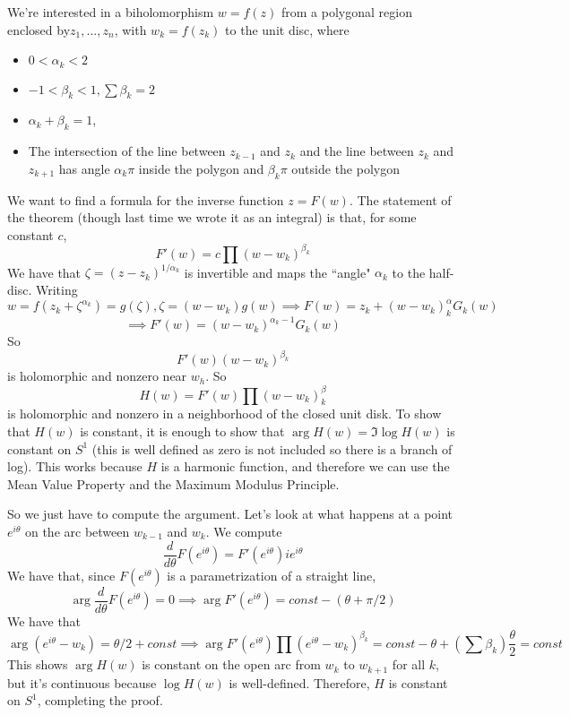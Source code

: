 \documentclass{article}
\begin{document}
We're interested in a biholomorphism \(w = f(z)\) from a polygonal region enclosed by\(z_1,...,z_n\), with \(w_k = f(z_k)\) to the unit disc, where
\begin{itemize}

  \item \(0 < \alpha_k < 2\)

  \item \(-1 < \beta_k < 1, \sum\beta_k = 2\)

  \item \(\alpha_k + \beta_k = 1\),

  \item The intersection of the line between \(z_{k - 1}\) and \(z_k\) and the line between \(z_k\) and \(z_{k + 1}\) has angle \(\alpha_k\pi\) inside the polygon and \(\beta_k\pi\) outside the polygon

\end{itemize}
We want to find a formula for the inverse function \(z = F(w)\). The statement of the theorem (though last time we wrote it as an integral) is that, for some constant \(c\),
\[F'(w) = c\prod(w - w_k)^{\beta_k}\]
We have that \(\zeta = (z - z_k)^{1/\alpha_k}\) is invertible and maps the ``angle" \(\alpha_k\) to the half-disc. Writing
\[w = f(z_k + \zeta^{\alpha_k}) = g(\zeta), \zeta = (w - w_k)g(w) \implies F(w) = z_k + (w - w_k)^\alpha_kG_k(w)\]
\[\implies F'(w) = (w - w_k)^{\alpha_k - 1}G_k(w)\]
So
\[F'(w)(w - w_k)^{\beta_k}\]
is holomorphic and nonzero near \(w_h\). So
\[H(w) = F'(w)\prod(w - w_k)^\beta_k\]
is holomorphic and nonzero in a neighborhood of the closed unit disk. To show that \(H(w)\) is constant, it is enough to show that \(\arg H(w) = \Im\log H(w)\) is constant on \(S^1\) (this is well defined as zero is not included so there is a branch of log). This works because \(H\) is a harmonic function, and therefore we can use the Mean Value Property and the Maximum Modulus Principle.

So we just have to compute the argument. Let's look at what happens at a point \(e^{i\theta}\) on the arc between \(w_{k - 1}\) and \(w_k\). We compute
\[\frac{d}{d\theta}F(e^{i\theta}) = F'(e^{i\theta})ie^{i\theta}\]
We have that, since \(F(e^{i\theta})\) is a parametrization of a straight line,
\[\arg\frac{d}{d\theta}F(e^{i\theta}) = 0 \implies \arg F'(e^{i\theta}) = const - (\theta + \pi/2)\]
We have that
\[\arg(e^{i\theta} - w_k) = \theta/2 + const \implies \arg F'(e^{i\theta})\prod(e^{i\theta} - w_k)^{\beta_k} = const - \theta + (\sum\beta_k)\frac{\theta}{2} = const\]
This shows \(\arg H(w)\) is constant on the open arc from \(w_k\) to \(w_{k + 1}\) for all \(k\), but it's continuous because \(\log H(w)\) is well-defined. Therefore, \(H\) is constant on \(S^1\), completing the proof.
\end{document}
